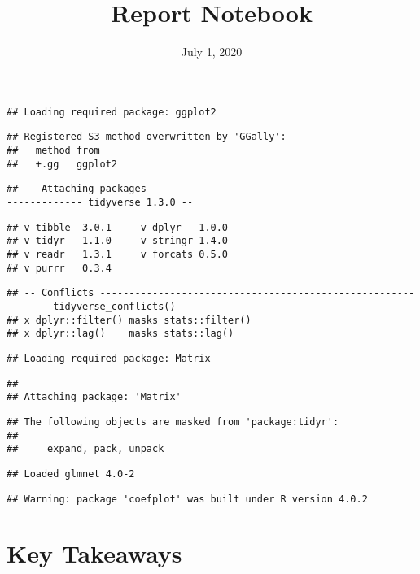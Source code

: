 \documentclass[
]{article}
\title{Report Notebook}
\author{}
\date{\vspace{-2.5em}July 1, 2020}
\begin{document}
\maketitle

\begin{verbatim}
## Loading required package: ggplot2
\end{verbatim}

\begin{verbatim}
## Registered S3 method overwritten by 'GGally':
##   method from   
##   +.gg   ggplot2
\end{verbatim}

\begin{verbatim}
## -- Attaching packages ---------------------------------------------------------- tidyverse 1.3.0 --
\end{verbatim}

\begin{verbatim}
## v tibble  3.0.1     v dplyr   1.0.0
## v tidyr   1.1.0     v stringr 1.4.0
## v readr   1.3.1     v forcats 0.5.0
## v purrr   0.3.4
\end{verbatim}

\begin{verbatim}
## -- Conflicts ------------------------------------------------------------- tidyverse_conflicts() --
## x dplyr::filter() masks stats::filter()
## x dplyr::lag()    masks stats::lag()
\end{verbatim}

\begin{verbatim}
## Loading required package: Matrix
\end{verbatim}

\begin{verbatim}
## 
## Attaching package: 'Matrix'
\end{verbatim}

\begin{verbatim}
## The following objects are masked from 'package:tidyr':
## 
##     expand, pack, unpack
\end{verbatim}

\begin{verbatim}
## Loaded glmnet 4.0-2
\end{verbatim}

\begin{verbatim}
## Warning: package 'coefplot' was built under R version 4.0.2
\end{verbatim}

\hypertarget{key-takeaways}{%
\section{Key Takeaways}\label{key-takeaways}}
\end{document}
